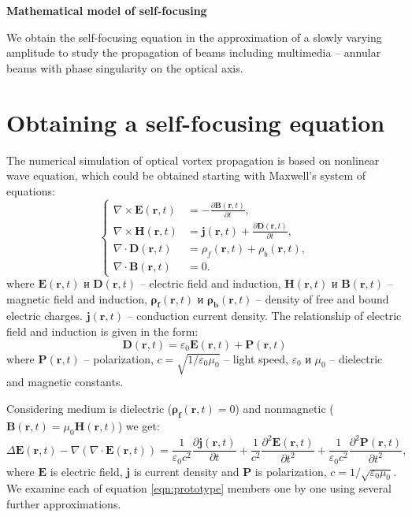\documentclass[a4paper, 12pt]{article}
\begin{document}
\begin{center}
\Huge{\textbf{Mathematical model of self-focusing}}
\end{center}

We obtain the self-focusing equation in the approximation of a slowly varying amplitude to study the propagation of beams including multimedia -- annular beams with phase singularity on the optical axis.

\section{Obtaining a self-focusing equation}

The numerical simulation of optical vortex propagation is based on nonlinear wave equation, which could be obtained starting with Maxwell's system of equations:
\begin{equation}
\label{eqn:maxwell}
\left\{
\begin{aligned}
\nabla \times \mathbf{E}(\mathbf{r}, t) &= -\frac{\partial \mathbf{B}(\mathbf{r}, t)}{\partial t},\\
\nabla \times \mathbf{H}(\mathbf{r}, t) &= \mathbf{j}(\mathbf{r}, t) + \frac{\partial \mathbf{D}(\mathbf{r}, t)}{\partial t},\\[0.2cm]
\nabla \cdot \mathbf{D}(\mathbf{r}, t) &= \rho_f (\mathbf{r}, t) + \rho_b (\mathbf{r}, t), \\[0.3cm]
\nabla \cdot \mathbf{B}(\mathbf{r}, t) &= 0.
\end{aligned}
\right.
\end{equation}
where $\mathbf{E}(\mathbf{r}, t)$ и $\mathbf{D}(\mathbf{r}, t)$ -- electric field and induction, $\mathbf{H}(\mathbf{r}, t)$ и $\mathbf{B}(\mathbf{r}, t)$ -- magnetic field and induction, $\mathbf{\rho_f}(\mathbf{r}, t)$ и $\mathbf{\rho_b}(\mathbf{r}, t)$ -- density of free and bound electric charges. $\mathbf{j}(\mathbf{r}, t)$ -- conduction current density. The relationship of electric field and induction is given in the form:
\begin{equation}
\label{eqn:D}
\mathbf{D}(\mathbf{r}, t) = \varepsilon_0 \mathbf{E}(\mathbf{r}, t) + \mathbf{P}(\mathbf{r}, t)
\end{equation}
where $\mathbf{P}(\mathbf{r}, t)$ -- polarization, $c = \sqrt{1 / \varepsilon_0 \mu_0}$ -- light speed, $\varepsilon_0$ и $\mu_0$ -- dielectric and magnetic constants.

Considering medium is dielectric ($\mathbf{\rho_f}(\mathbf{r}, t) = 0$) and nonmagnetic ($\mathbf{B}(\mathbf{r}, t) = \mu_0 \mathbf{H}(\mathbf{r}, t)$) 
we get:
\begin{equation}
\label{eqn:prototype}
\Delta \mathbf{E}(\mathbf{r}, t) - \nabla (\nabla \cdot \mathbf{E}(\mathbf{r}, t)) =  \frac1{\varepsilon_0 c^2} \frac{\partial \mathbf{j}(\mathbf{r}, t)}{\partial t} + \frac1{c^2} \frac{\partial^2 \mathbf{E}(\mathbf{r}, t)}{\partial t^2} + \frac1{\varepsilon_0 c^2} \frac{\partial^2 \mathbf{P}(\mathbf{r}, t)}{\partial t^2},
\end{equation}
where $\mathbf{E}$ is electric field, $\mathbf{j}$ is current density and $\mathbf{P}$ is polarization, $c=1/\sqrt{\varepsilon_0 \mu_0}$. We examine each of equation \eqref{eqn:prototype} members one by one using several further approximations. 
\end{document}
